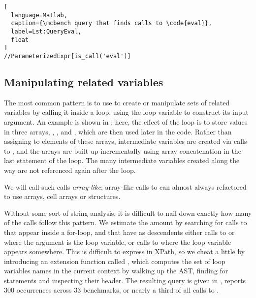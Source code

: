 \begin{lstlisting}[
  language=Matlab,
  caption={\mcbench query that finds calls to \code{eval}},
  label=Lst:QueryEval,
  float
]
//ParameterizedExpr[is_call('eval')]
\end{lstlisting}


\subsection{Manipulating related variables} \label{sec:ArrayLikeEval}

The most common pattern is to use  to create or manipulate sets of
related variables by calling it inside a loop, using the loop variable to
construct its input argument. An example is shown in ;
here, the effect of the loop is to store values in three arrays, ,
, and , which are then used later in the code. Rather than
assigning to elements of these arrays, intermediate variables are created via
calls to , and the arrays are built up incrementally using array
concatenation in the last statement of the loop. The many intermediate
variables created along the way are not referenced again after the loop.

We will call such calls \emph{array-like}; array-like calls to  can
almost always refactored to use arrays, cell arrays or structures.



Without some sort of string analysis, it is difficult to nail down exactly how
many of the calls follow this pattern. We estimate the amount by searching for
calls to  that appear inside a for-loop, and that have as
descendents either calls to  or  where the argument
is the loop variable, or calls to  where the loop variable
appears somewhere. This is difficult to express in XPath, so we cheat a little
by introducing an extension function called , which computes
the set of loop variables names in the current context by walking up the AST,
finding for statements and inspecting their header. The resulting query is
given in , reports 300 occurrences across 33
benchmarks, or nearly a third of all calls to .

